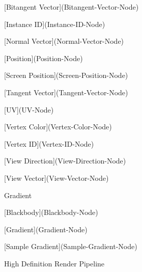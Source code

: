 \begin{DoxyItemize}
\begin{DoxyItemize}
\begin{DoxyItemize}
\begin{DoxyItemize}
\item \mbox{[}Bitangent Vector\mbox{]}(Bitangent-\/\+Vector-\/\+Node)
\item \mbox{[}Instance ID\mbox{]}(Instance-\/\+ID-\/\+Node)
\item \mbox{[}Normal Vector\mbox{]}(Normal-\/\+Vector-\/\+Node)
\item \mbox{[}Position\mbox{]}(Position-\/\+Node)
\item \mbox{[}Screen Position\mbox{]}(Screen-\/\+Position-\/\+Node)
\item \mbox{[}Tangent Vector\mbox{]}(Tangent-\/\+Vector-\/\+Node)
\item \mbox{[}UV\mbox{]}(UV-\/\+Node)
\item \mbox{[}Vertex Color\mbox{]}(Vertex-\/\+Color-\/\+Node)
\item \mbox{[}Vertex ID\mbox{]}(Vertex-\/\+ID-\/\+Node)
\item \mbox{[}View Direction\mbox{]}(View-\/\+Direction-\/\+Node)
\item \mbox{[}View Vector\mbox{]}(View-\/\+Vector-\/\+Node)
\end{DoxyItemize}
\item Gradient
\begin{DoxyItemize}
\item \mbox{[}Blackbody\mbox{]}(Blackbody-\/\+Node)
\item \mbox{[}Gradient\mbox{]}(Gradient-\/\+Node)
\item \mbox{[}Sample Gradient\mbox{]}(Sample-\/\+Gradient-\/\+Node)
\end{DoxyItemize}
\item High Definition Render Pipeline
\begin{DoxyItemize}
\item {}
\item {}
\item {}
\item {}

\end{DoxyItemize}
\end{DoxyItemize}
\end{DoxyItemize}
\end{DoxyItemize}
